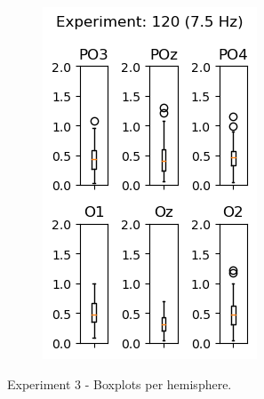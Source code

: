 \begin{figure}[ht]
\begin{subfigure}{0.25\linewidth}
        \includegraphics[width=\linewidth]{images/appendix/12075.png}
        \label{fig:12075}
    \end{subfigure}
    \caption{Experiment 3 - Boxplots per hemisphere.}
    \label{fig:3-6675}
\end{figure}


